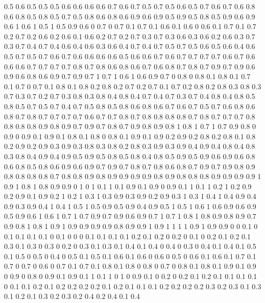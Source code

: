 0.5 0.6
0.5 0.5
0.5 0.6
0.6 0.6
0.6 0.7
0.6 0.7
0.5 0.7
0.5 0.6
0.5 0.7
0.6 0.7
0.6 0.8
0.6 0.8
0.5 0.8
0.5 0.7
0.5 0.8
0.6 0.8
0.6 0.9
0.6 0.9
0.5 0.9
0.5 0.8
0.5 0.9
0.6 0.9
0.6 1
0.6 1
0.5 1
0.5 0.9
0.6 0
0.7 0
0.7 0.1
0.7 0.1
0.6 0.1
0.6 0
0.6 0.1
0.7 0.1
0.7 0.2
0.7 0.2
0.6 0.2
0.6 0.1
0.6 0.2
0.7 0.2
0.7 0.3
0.7 0.3
0.6 0.3
0.6 0.2
0.6 0.3
0.7 0.3
0.7 0.4
0.7 0.4
0.6 0.4
0.6 0.3
0.6 0.4
0.7 0.4
0.7 0.5
0.7 0.5
0.6 0.5
0.6 0.4
0.6 0.5
0.7 0.5
0.7 0.6
0.7 0.6
0.6 0.6
0.6 0.5
0.6 0.6
0.7 0.6
0.7 0.7
0.7 0.7
0.6 0.7
0.6 0.6
0.6 0.7
0.7 0.7
0.7 0.8
0.7 0.8
0.6 0.8
0.6 0.7
0.6 0.8
0.7 0.8
0.7 0.9
0.7 0.9
0.6 0.9
0.6 0.8
0.6 0.9
0.7 0.9
0.7 1
0.7 1
0.6 1
0.6 0.9
0.7 0
0.8 0
0.8 0.1
0.8 0.1
0.7 0.1
0.7 0
0.7 0.1
0.8 0.1
0.8 0.2
0.8 0.2
0.7 0.2
0.7 0.1
0.7 0.2
0.8 0.2
0.8 0.3
0.8 0.3
0.7 0.3
0.7 0.2
0.7 0.3
0.8 0.3
0.8 0.4
0.8 0.4
0.7 0.4
0.7 0.3
0.7 0.4
0.8 0.4
0.8 0.5
0.8 0.5
0.7 0.5
0.7 0.4
0.7 0.5
0.8 0.5
0.8 0.6
0.8 0.6
0.7 0.6
0.7 0.5
0.7 0.6
0.8 0.6
0.8 0.7
0.8 0.7
0.7 0.7
0.7 0.6
0.7 0.7
0.8 0.7
0.8 0.8
0.8 0.8
0.7 0.8
0.7 0.7
0.7 0.8
0.8 0.8
0.8 0.9
0.8 0.9
0.7 0.9
0.7 0.8
0.7 0.9
0.8 0.9
0.8 1
0.8 1
0.7 1
0.7 0.9
0.8 0
0.9 0
0.9 0.1
0.9 0.1
0.8 0.1
0.8 0
0.8 0.1
0.9 0.1
0.9 0.2
0.9 0.2
0.8 0.2
0.8 0.1
0.8 0.2
0.9 0.2
0.9 0.3
0.9 0.3
0.8 0.3
0.8 0.2
0.8 0.3
0.9 0.3
0.9 0.4
0.9 0.4
0.8 0.4
0.8 0.3
0.8 0.4
0.9 0.4
0.9 0.5
0.9 0.5
0.8 0.5
0.8 0.4
0.8 0.5
0.9 0.5
0.9 0.6
0.9 0.6
0.8 0.6
0.8 0.5
0.8 0.6
0.9 0.6
0.9 0.7
0.9 0.7
0.8 0.7
0.8 0.6
0.8 0.7
0.9 0.7
0.9 0.8
0.9 0.8
0.8 0.8
0.8 0.7
0.8 0.8
0.9 0.8
0.9 0.9
0.9 0.9
0.8 0.9
0.8 0.8
0.8 0.9
0.9 0.9
0.9 1
0.9 1
0.8 1
0.8 0.9
0.9 0
1 0
1 0.1
1 0.1
0.9 0.1
0.9 0
0.9 0.1
1 0.1
1 0.2
1 0.2
0.9 0.2
0.9 0.1
0.9 0.2
1 0.2
1 0.3
1 0.3
0.9 0.3
0.9 0.2
0.9 0.3
1 0.3
1 0.4
1 0.4
0.9 0.4
0.9 0.3
0.9 0.4
1 0.4
1 0.5
1 0.5
0.9 0.5
0.9 0.4
0.9 0.5
1 0.5
1 0.6
1 0.6
0.9 0.6
0.9 0.5
0.9 0.6
1 0.6
1 0.7
1 0.7
0.9 0.7
0.9 0.6
0.9 0.7
1 0.7
1 0.8
1 0.8
0.9 0.8
0.9 0.7
0.9 0.8
1 0.8
1 0.9
1 0.9
0.9 0.9
0.9 0.8
0.9 0.9
1 0.9
1 1
1 1
0.9 1
0.9 0.9
0 0
0.1 0
0.1 0.1
0.1 0.1
0 0.1
0 0
0 0.1
0.1 0.1
0.1 0.2
0.1 0.2
0 0.2
0 0.1
0 0.2
0.1 0.2
0.1 0.3
0.1 0.3
0 0.3
0 0.2
0 0.3
0.1 0.3
0.1 0.4
0.1 0.4
0 0.4
0 0.3
0 0.4
0.1 0.4
0.1 0.5
0.1 0.5
0 0.5
0 0.4
0 0.5
0.1 0.5
0.1 0.6
0.1 0.6
0 0.6
0 0.5
0 0.6
0.1 0.6
0.1 0.7
0.1 0.7
0 0.7
0 0.6
0 0.7
0.1 0.7
0.1 0.8
0.1 0.8
0 0.8
0 0.7
0 0.8
0.1 0.8
0.1 0.9
0.1 0.9
0 0.9
0 0.8
0 0.9
0.1 0.9
0.1 1
0.1 1
0 1
0 0.9
0.1 0
0.2 0
0.2 0.1
0.2 0.1
0.1 0.1
0.1 0
0.1 0.1
0.2 0.1
0.2 0.2
0.2 0.2
0.1 0.2
0.1 0.1
0.1 0.2
0.2 0.2
0.2 0.3
0.2 0.3
0.1 0.3
0.1 0.2
0.1 0.3
0.2 0.3
0.2 0.4
0.2 0.4
0.1 0.4
